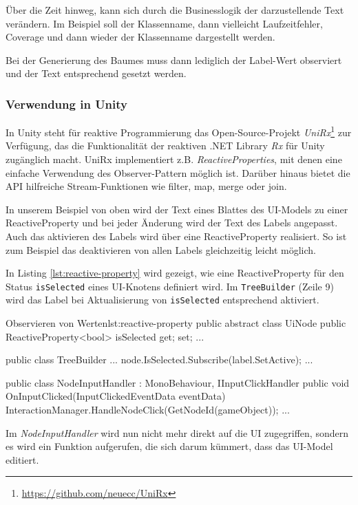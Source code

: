 Über die Zeit hinweg, kann sich durch die Businesslogik der darzustellende Text verändern. Im Beispiel soll der Klassenname, dann vielleicht Laufzeitfehler, Coverage und dann wieder der Klassenname dargestellt werden.

Bei der Generierung des Baumes muss dann lediglich der Label-Wert observiert und der Text entsprechend gesetzt werden.

\subsubsection*{Verwendung in Unity}

In Unity steht für reaktive Programmierung das Open-Source-Projekt \textit{UniRx}\footnote{\url{https://github.com/neuecc/UniRx}} zur Verfügung, das die Funktionalität der reaktiven .NET Library \textit{Rx} für Unity zugänglich macht. UniRx implementiert z.B. \textit{ReactiveProperties}, mit denen eine einfache Verwendung des Observer-Pattern möglich ist. Darüber hinaus bietet die API hilfreiche Stream-Funktionen wie filter, map, merge oder join.

In unserem Beispiel von oben wird der Text eines Blattes des UI-Models zu einer ReactiveProperty und bei jeder Änderung wird der Text des Labels angepasst. Auch das aktivieren des Labels wird über eine ReactiveProperty realisiert. So ist zum Beispiel das deaktivieren von allen Labels gleichzeitig leicht möglich.

In Listing \ref{lst:reactive-property} wird gezeigt, wie eine ReactiveProperty für den Status \texttt{isSelected} eines UI-Knotens definiert wird. Im \texttt{TreeBuilder} (Zeile 9) wird das Label bei Aktualisierung von \texttt{isSelected} entsprechend aktiviert.

\begin{codesnippet}{Observieren von Werten}{lst:reactive-property}
public abstract class UiNode
{
    public ReactiveProperty<bool> isSelected { get; set; }
    ...
}

public class TreeBuilder {
    ...
    node.IsSelected.Subscribe(label.SetActive);
    ...
}

public class NodeInputHandler : MonoBehaviour, IInputClickHandler
{
    public void OnInputClicked(InputClickedEventData eventData)
    {
        InteractionManager.HandleNodeClick(GetNodeId(gameObject));
    }
    ...
}
\end{codesnippet}

Im \textit{NodeInputHandler} wird nun nicht mehr direkt auf die UI zugegriffen, sondern es wird ein Funktion aufgerufen, die sich darum kümmert, dass das UI-Model editiert.

